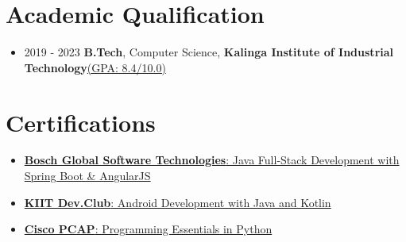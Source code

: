 \documentclass[a4paper,10pt]{article}
\begin{document}
\section{Academic Qualification}
\begin{itemize}[leftmargin=0pt, itemsep=-5pt, label={}]
    \item 2019 - 2023 \quad \textbf{B.Tech}, Computer Science, \textbf{Kalinga Institute of Industrial Technology}\hfill \href{https://drive.google.com/drive/folders/1h5LNKPWNgZ1L8anU-jVDjidfd6seIepw?usp=share_link}{(GPA: 8.4/10.0)}
\end{itemize}


\section{Certifications}
\begin{itemize}[leftmargin=*, itemsep=-5pt]
    \item \href{https://drive.google.com/file/d/1hNmzpBB9Um7AT7RnKK6kc4xhsKgf8IDf/view?usp=drive_link}{\textbf{Bosch Global Software Technologies}: Java Full-Stack Development with Spring Boot \& AngularJS}
    \item \href{https://drive.google.com/drive/folders/1XwdbdVNaHuVHK1NeESkouDhpwcP_5glF?usp=drive_link}{\textbf{KIIT Dev.Club}: Android Development with Java and Kotlin}
    \item \href{https://drive.google.com/file/d/1CvSL6iyRV-ZCHSulV9tekqkfXSV8wti2/view?usp=drive_link}{\textbf{Cisco PCAP}: Programming Essentials in Python}

\end{itemize}


\vfill
{}
\end{document}
